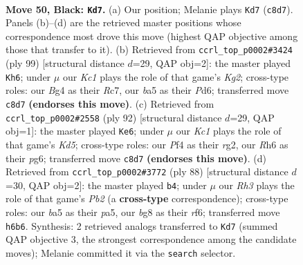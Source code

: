 \documentclass[11pt]{article}
\begin{document}
\begin{figure}[p]\centering
\begin{subfigure}{0.46\textwidth}\centering
\resizebox{\linewidth}{!}{%
\newchessgame
\chessboard[
  setfen={2k3B1/8/7r/B7/P4pbp/1P6/1K6/R5N1 b - - 0 50},
  showmover=false,
  pgfstyle=straightmove, color=movearrow, markmove={c8-d7}
]}
\caption{}
\end{subfigure}\hfill
\begin{subfigure}{0.46\textwidth}\centering
\resizebox{\linewidth}{!}{%
\newchessgame
\chessboard[
  setfen={8/2r3k1/3p4/1p2b2p/1P6/1B3R1P/P5K1/8 b - - 0 50},
  showmover=false,
  pgfstyle=straightmove, color=movearrow, markmove={g7-h6}
]}
\caption{}
\end{subfigure}
\\[4pt]
\begin{subfigure}{0.46\textwidth}\centering
\resizebox{\linewidth}{!}{%
\newchessgame
\chessboard[
  setfen={1R6/3P2kp/5bp1/3K4/p1B5/7P/6r1/8 w - - 0 47},
  showmover=false,
  pgfstyle=straightmove, color=movearrow, markmove={d5-e6}
]}
\caption{}
\end{subfigure}\hfill
\begin{subfigure}{0.46\textwidth}\centering
\resizebox{\linewidth}{!}{%
\newchessgame
\chessboard[
  setfen={8/3R4/1p3r2/p5k1/P1B2p2/5Pn1/KP6/8 w - - 2 45},
  showmover=false,
  pgfstyle=straightmove, color=movearrow, markmove={b2-b4}
]}
\caption{}
\end{subfigure}
\caption{\textbf{Move 50, Black: \texttt{Kd7}.} (a) Our position; Melanie plays \texttt{Kd7} (\texttt{c8d7}). Panels (b)--(d) are the retrieved master positions whose correspondence most drove this move (highest QAP objective among those that transfer to it). (b) Retrieved from \texttt{ccrl\_top\_p0002\#3424} (ply 99) [structural distance $d$=29, QAP obj=2]: the master played \texttt{Kh6}; under $\mu$ our \emph{Kc1} plays the role of that game's \emph{Kg2}; cross-type roles: our \emph{B}g4 as their \emph{R}c7, our \emph{b}a5 as their \emph{P}d6; transferred move \texttt{c8d7} \textbf{(endorses this move)}. (c) Retrieved from \texttt{ccrl\_top\_p0002\#2558} (ply 92) [structural distance $d$=29, QAP obj=1]: the master played \texttt{Ke6}; under $\mu$ our \emph{Kc1} plays the role of that game's \emph{Kd5}; cross-type roles: our \emph{P}f4 as their \emph{r}g2, our \emph{R}h6 as their \emph{p}g6; transferred move \texttt{c8d7} \textbf{(endorses this move)}. (d) Retrieved from \texttt{ccrl\_top\_p0002\#3772} (ply 88) [structural distance $d$=30, QAP obj=2]: the master played \texttt{b4}; under $\mu$ our \emph{Rh3} plays the role of that game's \emph{Pb2} (a \textbf{cross-type} correspondence); cross-type roles: our \emph{b}a5 as their \emph{p}a5, our \emph{b}g8 as their \emph{r}f6; transferred move \texttt{h6b6}. Synthesis: 2 retrieved analogs transferred to \texttt{Kd7} (summed QAP objective 3, the strongest correspondence among the candidate moves); Melanie committed it via the \texttt{search} selector.}
\label{fig:thought-m99}
\end{figure}
\end{document}
